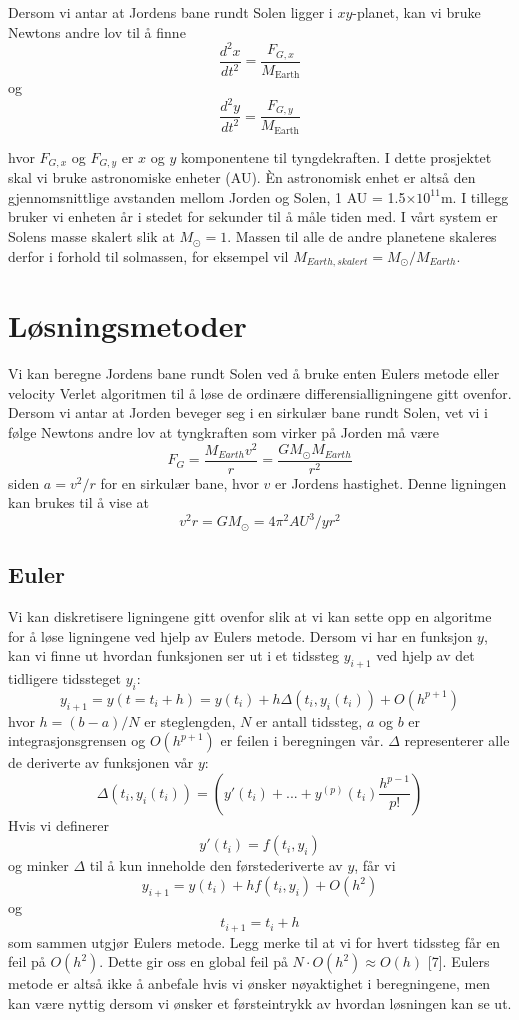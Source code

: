 \documentclass[11pt,a4paper]{article}
\begin{document}
Dersom vi antar at Jordens bane rundt Solen ligger i $xy$-planet, kan vi bruke Newtons andre lov til å finne
\begin{equation}
 \frac{d^2x}{dt^2}=\frac{F_{G,x}}{M_{\mathrm{Earth}}}
\end{equation}
og 
\begin{equation}
\frac{d^2y}{dt^2}=\frac{F_{G,y}}{M_{\mathrm{Earth}}}
\end{equation}

hvor $F_{G,x}$ og $F_{G,y}$ er $x$ og $y$ komponentene til tyngdekraften. I dette prosjektet skal vi bruke astronomiske enheter (AU). Èn astronomisk enhet er altså den gjennomsnittlige avstanden mellom Jorden og Solen, 1 AU = 1.5$\times10^{11}$m. I tillegg bruker vi enheten år i stedet for sekunder til å måle tiden med. I vårt system er Solens masse skalert slik at $M_{\odot} = 1$. Massen til alle de andre planetene skaleres derfor i forhold til solmassen, for eksempel vil $M_{Earth,skalert} = M_{\odot}/M_{Earth}$. 


\section{Løsningsmetoder}
Vi kan beregne Jordens bane rundt Solen ved å bruke enten Eulers metode eller velocity Verlet algoritmen til å løse de ordinære differensialligningene gitt ovenfor. Dersom vi antar at Jorden beveger seg i en sirkulær bane rundt Solen, vet vi i følge Newtons andre lov at tyngkraften som virker på Jorden må være
\[F_G = \frac{M_{Earth}v^2}{r} = \frac{GM_{\odot}M_{Earth}}{r^2}  \]
siden $a = v^2/r$ for en sirkulær bane, hvor $v$ er Jordens hastighet. Denne ligningen kan brukes til å vise at 
\[v^2r = GM_{\odot} = 4\pi^2 AU^3/yr^2  \]

\subsection{Euler}
Vi kan diskretisere ligningene gitt ovenfor slik at vi kan sette opp en algoritme for å løse ligningene ved hjelp av Eulers metode. Dersom vi har en funksjon $y$, kan vi finne ut hvordan funksjonen ser ut i et tidssteg $y_{i+1}$ ved hjelp av det tidligere tidssteget $y_i$:
\[y_{i+1} = y(t= t_i + h) = y(t_i) + h\Delta(t_i, y_i(t_i)) + O(h^{p+1}) \]
hvor $h = (b - a)/N$ er steglengden, $N$ er antall tidssteg, $a$ og $b$ er integrasjonsgrensen og $O(h^{p+1})$ er feilen i beregningen vår. $\Delta$ representerer alle de deriverte av funksjonen vår $y$:
\[\Delta(t_i, y_i(t_i)) = (y'(t_i) + ... + y^{(p)}(t_i)\frac{h^{p-1}}{p!} )  \]
Hvis vi definerer
\[y'(t_i) = f(t_i, y_i) \]
og minker $\Delta$ til å kun inneholde den førstederiverte av $y$, får vi
\[y_{i+1} = y(t_i) + hf(t_i,y_i) + O(h^2)  \]
og 
\[t_{i+1} = t_i + h \]
som sammen utgjør Eulers metode. Legg merke til at vi for hvert tidssteg får en feil på $O(h^2)$. Dette gir oss en global feil på $N\cdot O(h^2) \approx O(h)$  [7]. Eulers metode er altså ikke å anbefale hvis vi ønsker nøyaktighet i beregningene, men kan være nyttig dersom vi ønsker et førsteintrykk av hvordan løsningen kan se ut. \\
\end{document}
